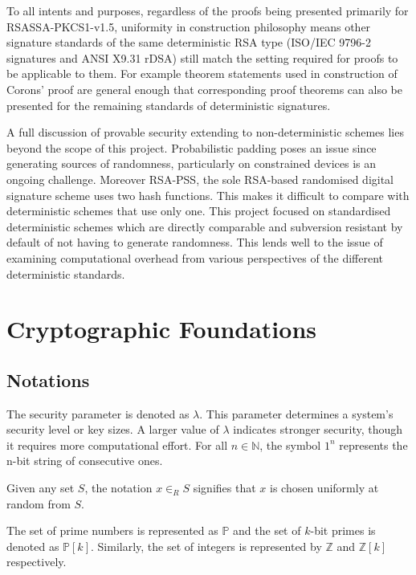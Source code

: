 \documentclass[]{final_report}
\theoremstyle{definition}
\begin{document}
To all intents and purposes, regardless of the proofs being presented primarily for RSASSA-PKCS1-v1.5, uniformity in construction philosophy means other signature standards of the same deterministic RSA type (ISO/IEC 9796-2 signatures and ANSI X9.31 rDSA) still match the setting required for proofs to be applicable to them. For example theorem statements used in construction of Corons' proof \cite{coron2002security} are general enough that corresponding proof theorems can also be presented for the remaining standards of deterministic signatures. 

A full discussion of provable security extending to non-deterministic schemes lies beyond the scope of this project. Probabilistic padding poses an issue since generating sources of randomness, particularly on constrained devices is an ongoing challenge. Moreover RSA-PSS, the sole RSA-based randomised digital signature scheme uses two hash functions. This makes it difficult to compare with deterministic schemes that use only one. This project focused on standardised deterministic schemes which are directly comparable and subversion resistant \cite{ateniese2015subversion} by default of not having to generate randomness. This lends well to the issue of examining computational overhead from various perspectives of the different deterministic standards.



\chapter{Cryptographic Foundations}
\section{Notations}
The security parameter is denoted as \( \lambda \). 
This parameter determines a system's security level or key sizes. A larger value of $\lambda$ indicates stronger security, though it requires more computational effort. For all \( n \in \mathbb{N} \), the symbol \( 1^n \) represents the n-bit string of consecutive ones. 

Given any set \( S \), the notation \( x \in_{R} S \) signifies that \( x \) is chosen uniformly at random from \( S \).  

The set of prime numbers is represented as \( \mathbb{P} \) and the set of \( k \)-bit primes is denoted as \( \mathbb{P}[k] \). Similarly, the set of integers is represented by \( \mathbb{Z} \) and \( \mathbb{Z}[k] \) respectively. 
\end{document}
